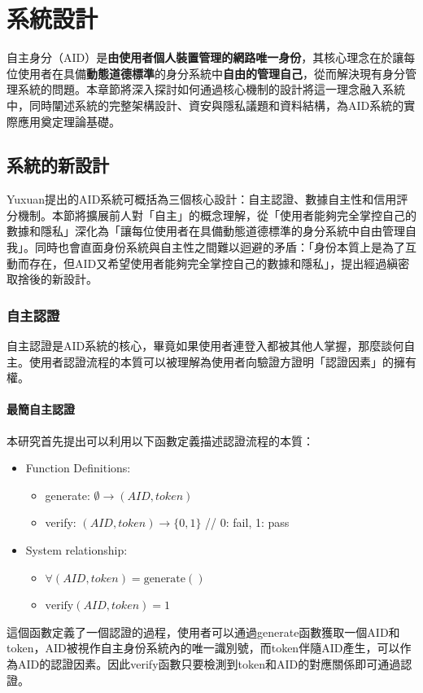 
\chapter{系統設計}
自主身分（AID）是\textbf{由使用者個人裝置管理的網路唯一身份}，其核心理念在於讓每位使用者在具備\textbf{動態道德標準}的身分系統中\textbf{自由的管理自己}，從而解決現有身分管理系統的問題。本章節將深入探討如何通過核心機制的設計將這一理念融入系統中，同時闡述系統的完整架構設計、資安與隱私議題和資料結構，為AID系統的實際應用奠定理論基礎。
\section{系統的新設計}
Yuxuan\cite{ntu-lin2014autonomous}提出的AID系統可概括為三個核心設計：自主認證、數據自主性和信用評分機制。本節將擴展前人對「自主」的概念理解，從「使用者能夠完全掌控自己的數據和隱私」深化為「讓每位使用者在具備動態道德標準的身分系統中自由管理自我」。同時也會直面身份系統與自主性之間難以迴避的矛盾：「身份本質上是為了互動而存在，但AID又希望使用者能夠完全掌控自己的數據和隱私」，提出經過縝密取捨後的新設計。
\subsection{自主認證}
自主認證是AID系統的核心，畢竟如果使用者連登入都被其他人掌握，那麼談何自主。使用者認證流程的本質可以被理解為使用者向驗證方證明「認證因素」\cite{AlQahtani2021AF}的擁有權。
\subsubsection{最簡自主認證}
本研究首先提出可以利用以下函數定義描述認證流程的本質：
\begin{itemize}
  \item Function Definitions:
        \begin{itemize}
          \item generate: $\emptyset \rightarrow (AID, token)$
          \item verify: $(AID, token) \rightarrow \{0,1\}$ \hfill // 0: fail, 1: pass
        \end{itemize}
  \item System relationship:
        \begin{itemize}
          \item $\forall(AID, token) = \text{generate}()$
          \item $\text{verify}(AID, token) = 1$
        \end{itemize}
\end{itemize}
這個函數定義了一個認證的過程，使用者可以通過generate函數獲取一個AID和token，AID被視作自主身份系統內的唯一識別號，而token伴隨AID產生，可以作為AID的認證因素。因此verify函數只要檢測到token和AID的對應關係即可通過認證。

